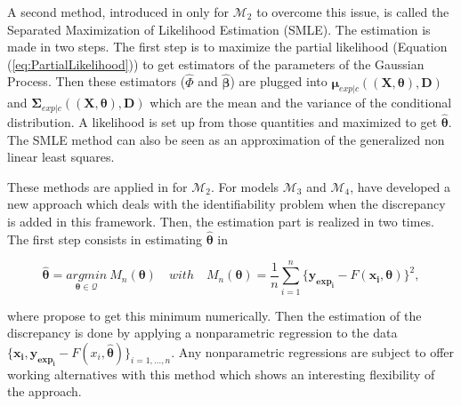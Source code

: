 \documentclass[soumission]{jsfds}
\begin{document}
A second method, introduced in \citet{cox2001} only for $\mathcal{M}_2$ to overcome this issue, is called the Separated Maximization of Likelihood Estimation (SMLE). 
The estimation is made in two steps. The first step is to maximize the partial likelihood (Equation (\ref{eq:PartialLikelihood})) to get estimators of the parameters of
 the Gaussian Process. Then these estimators ($\hat{\Phi}$ and $\hat{\boldsymbol{\beta}}$) are plugged  into $\boldsymbol{\mu}_{exp|c}((\boldsymbol{X},\boldsymbol{\theta}),\boldsymbol{D})$ and $\boldsymbol{\Sigma}_{exp|c}((\boldsymbol{X},\boldsymbol{\theta}),\boldsymbol{D})$ which are the mean and the variance of the conditional distribution. A likelihood is set up from those quantities and maximized to get $\hat{\boldsymbol{\theta}}$. The SMLE method can also be seen as an approximation of the  generalized non linear least squares. \newline

These methods are applied in \citet{cox2001} for $\mathcal{M}_2$. For models $\mathcal{M}_3$ and $\mathcal{M}_4$, \citep{wong2017} have developed a new approach which deals with the identifiability problem when the discrepancy is added in this framework. Then, the estimation part is realized in two times. The first step consists in estimating $\hat{\boldsymbol{\theta}}$ in 

\begin{equation}
\hat{\boldsymbol{\theta}}= \underset{\boldsymbol{\theta}\in\mathcal{Q}}{argmin} \ M_n(\boldsymbol{\theta}) \quad with \quad M_n(\boldsymbol{\theta})=\frac{1}{n}\sum_{i=1}^n \{\boldsymbol{y_{exp_i}}-F(\boldsymbol{x_i},\boldsymbol{\theta})\}^2,
\end{equation}

where \citet{cox2001} propose to get this minimum numerically. Then the estimation of the discrepancy is done by applying a nonparametric regression to the data $\{\boldsymbol{x_i},\boldsymbol{y_{exp_i}}-F(x_i,\hat{\boldsymbol{\theta}})\}_{i=1,\dots,n}$. Any nonparametric regressions are subject to offer working alternatives with this method which shows an interesting flexibility of the approach.\newline 


%
\end{document}

